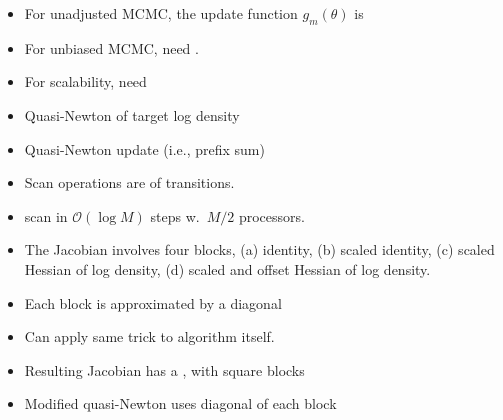 \documentclass[10pt]{report}
\begin{document}
\begin{itemize}
\item For unadjusted MCMC, the update function $g_m(\theta)$ is
\item For unbiased MCMC, need .
\item For scalability, need 
\item Quasi-Newton  of
  target log density
\end{itemize}

\begin{itemize}
\item Quasi-Newton update  (i.e., prefix sum)
\item Scan operations are  of transitions.
\item {} scan in
  $\mathcal{O}(\log M)$ steps w.\ $M / 2$ processors.
\item The Jacobian involves four blocks, (a) identity, (b) scaled
  identity, (c) scaled Hessian of log density, (d) scaled and offset
  Hessian of log density.
\item Each block is approximated by a diagonal
\end{itemize}

\begin{itemize}
\item Can apply same trick to  algorithm itself.
\item Resulting Jacobian has a , with
  square blocks
\item Modified quasi-Newton uses diagonal of each block
\end{itemize}
\end{document}
